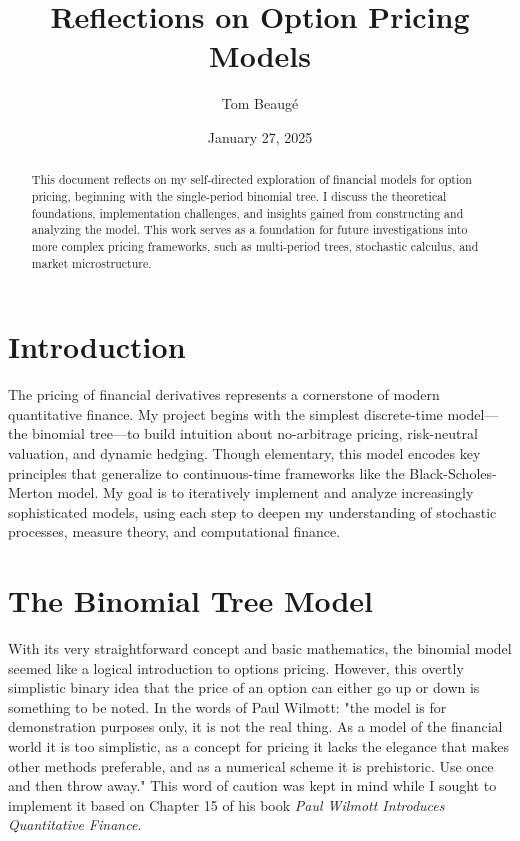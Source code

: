 \documentclass{article}
\title{Reflections on Option Pricing Models}
\author{Tom Beaugé}
\date{January 27, 2025}
\begin{document}
    \maketitle

    \begin{abstract}
        This document reflects on my self-directed exploration of financial models for option pricing, beginning with the single-period binomial tree. I discuss the theoretical foundations, implementation challenges, and insights gained from constructing and analyzing the model. This work serves as a foundation for future investigations into more complex pricing frameworks, such as multi-period trees, stochastic calculus, and market microstructure.
    \end{abstract}

    \section{Introduction}
    \label{sec:introduction}

    The pricing of financial derivatives represents a cornerstone of modern quantitative finance. My project begins with the simplest discrete-time model---the binomial tree---to build intuition about no-arbitrage pricing, risk-neutral valuation, and dynamic hedging. Though elementary, this model encodes key principles that generalize to continuous-time frameworks like the Black-Scholes-Merton model. My goal is to iteratively implement and analyze increasingly sophisticated models, using each step to deepen my understanding of stochastic processes, measure theory, and computational finance.

    \section{The Binomial Tree Model}
    \label{sec:binomial}

    With its very straightforward concept and basic mathematics, the binomial model seemed like a logical introduction to options pricing. However, this overtly simplistic binary idea that the price of an option can either go up or down is something to be noted. In the words of Paul Wilmott: "the model is for demonstration purposes only, it is not the real thing. As a model of the financial world it is too simplistic, as a concept for pricing it lacks the elegance that makes other methods preferable, and as a numerical scheme it is prehistoric. Use once and then throw away." This word of caution was kept in mind while I sought to implement it based on Chapter 15 of his book \textit{Paul Wilmott Introduces Quantitative Finance}.
\end{document}
